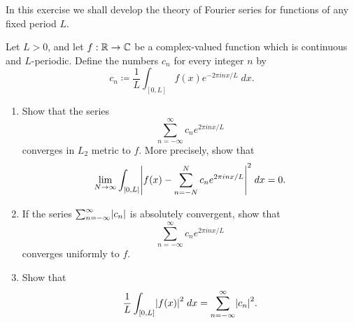 \begin{ex}\label{ex:5.5.6}
  In this exercise we shall develop the theory of Fourier series for functions of any fixed period \(L\).

  Let \(L > 0\), and let \(f : \mathbb{R} \to \mathbb{C}\) be a complex-valued function which is continuous and \(L\)-periodic.
  Define the numbers \(c_n\) for every integer \(n\) by
  \[
    c_n \coloneqq \frac{1}{L} \int_{[0, L]} f(x) e^{- 2 \pi i n x / L} \; dx.
  \]
  \begin{enumerate}
    \item Show that the series
          \[
            \sum_{n = -\infty}^\infty c_n e^{2 \pi i n x / L}
          \]
          converges in \(L_2\) metric to \(f\).
          More precisely, show that
          \[
            \lim_{N \to \infty} \int_{[0, L]} \abs{f(x) - \sum_{n = -N}^N c_n e^{2 \pi i n x / L}}^2 \; dx = 0.
          \]
    \item If the series \(\sum_{n = -\infty}^\infty \abs{c_n}\) is absolutely convergent, show that
          \[
            \sum_{n = -\infty}^\infty c_n e^{2 \pi i n x / L}
          \]
          converges uniformly to \(f\).
    \item Show that
          \[
            \frac{1}{L} \int_{[0, L]} \abs{f(x)}^2 \; dx = \sum_{n = -\infty}^\infty \abs{c_n}^2.
          \]
  \end{enumerate}
\end{ex}